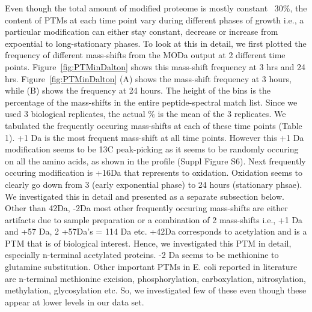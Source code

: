 \documentclass[12pt]{article}
\begin{document}
Even though the total amount of modified proteome is mostly constant ~30\%, the content of PTMs at each time point vary during different phases of growth i.e., a particular modification can either stay constant, decrease or increase from expoential to long-stationary phases. To look at this in detail, we first plotted the frequency of different mass-shifts from the MODa output at 2 different time points. Figure~\ref{fig:PTMinDalton} shows this mass-shift frequency at 3 hrs and 24 hrs. Figure~\ref{fig:PTMinDalton} (A) shows the mass-shift frequency at 3 hours, while (B) shows the frequency at 24 hours. The height of the bins is the percentage of the mass-shifts in the entire peptide-spectral match list. Since we used 3 biological replicates, the actual \% is the mean of the 3 replicates. We tabulated the frequently occuring mass-shifts at each of these time points (Table 1). +1 Da is the most frequent mass-shift at all time points. However this +1 Da modification seems to be 13C peak-picking as it seems to be randomly occuring on all the amino acids, as shown in the profile (Suppl Figure S6). Next frequently occuring modification is +16Da that represents to oxidation. Oxidation seems to clearly go down from 3 (early exponential phase) to 24 hours (stationary phsae). We investigated this in detail and presented as a separate subsection below. Other than 42Da, -2Da most other frequently occuring mass-shifts are either artifacts due to sample preparation or a combination of 2 mass-shifts i.e., +1 Da and +57 Da, 2 +57Da's = 114 Da etc. +42Da corresponds to acetylation and is a PTM that is of biological interest. Hence, we investigated this PTM in detail, especially n-terminal acetylated proteins. -2 Da seems to be methionine to glutamine substitution. Other important PTMs in E. coli reported in literature are n-terminal methionine excision, phosphorylation, carboxylation, nitrosylation, methylation, glycosylation etc. So, we investigated few of these even though these appear at lower levels in our data set.


\end{document}
